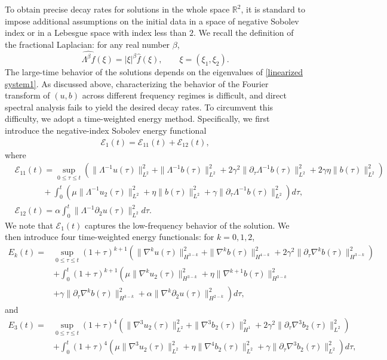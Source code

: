 \documentclass[reqno,11pt]{amsart}
\numberwithin{Thm}{section}
\begin{document}
To obtain precise decay rates for solutions in the whole space $\mathbb{R}^2$, it is
standard to impose additional assumptions on the initial data in a space of negative
Sobolev index or in a Lebesgue space with index less than $2$. We recall the definition
of the fractional Laplacian: for any real number $\beta$,
$$\widehat{\Lambda^{\beta}f}(\xi)=|\xi|^{\beta}\widehat{f}(\xi), \qquad \xi=(\xi_1,\xi_2).$$
The large-time behavior of the solutions depends on the eigenvalues of
\eqref{linearized system1}. As discussed above, characterizing the behavior of the
Fourier transform of $(u,b)$ across different frequency regimes is difficult, and direct
spectral analysis fails to yield the desired decay rates. To circumvent this difficulty,
we adopt a time-weighted energy method. Specifically, we first introduce the
negative-index Sobolev energy functional
\begin{align}\label{E-1}
	\mathcal{E}_1(t)=\mathcal{E}_{11}(t)+\mathcal{E}_{12}(t),
\end{align}
where
\begin{align*}
	&\mathcal{E}_{11}(t)=\sup_{0\leq\tau\leq t}\left(\|\Lambda^{-1} u(\tau)\|_{L^2}^2
	+\|\Lambda^{-1} b(\tau)\|_{L^2}^2+2\gamma^2\|\partial_\tau \Lambda^{-1} b(\tau)\|_{L^2}^2
+2\gamma\eta\|b(\tau)\|^2_{L^2}\right)\nonumber\\
	&\qquad \ \ \ \ \ \ +\int_{0}^t\left(\mu\|\Lambda^{-1} u_2(\tau)\|_{L^2}^2+\eta\| b(\tau)\|_{L^2}^2
	+\gamma\|\partial_\tau\Lambda^{-1} b(\tau)\|_{L^2}^2
	\right)d\tau,\\
    &\mathcal{E}_{12}(t)=\alpha\int_{0}^t
	\|\Lambda^{-1}\partial_2 u(\tau)\|_{L^2}^2d\tau.
\end{align*}
We note that $\mathcal{E}_1(t)$ captures the low-frequency behavior of the solution. We then introduce four
time-weighted energy functionals: for $k=0,1,2$,
\begin{align*}
	E_k(t)=&\sup_{0\leq\tau\leq t}(1+\tau)^{k+1}\left(\|\nabla^{k}u(\tau)\|_{H^{3-k}}^2
	+\|\nabla^{k}b(\tau)\|_{H^{4-k}}^2
	+2\gamma^2\|\partial_\tau\nabla^{k} b(\tau)\|_{H^{3-k}}^2\right)\\
	&+\int_{0}^t(1+\tau)^{k+1}\left(\mu\|\nabla^{k} u_2(\tau)\|_{H^{3-k}}^2
	+\eta\|\nabla^{k+1} b(\tau)\|_{H^{3-k}}^2\right.\\
	&+\left.\gamma\|\partial_\tau \nabla^{k}b(\tau)\|_{H^{3-k}}^2
	+\alpha\|\nabla^{k} \partial_2u(\tau)\|_{H^{2-k}}^2\right)d\tau,
\end{align*}
and
\begin{align*}
	E_3(t)=&\sup_{0\leq\tau\leq t}(1+\tau)^4\left(\|\nabla^3 u_2(\tau)\|_{L^2}^2
	+\|\nabla^3 b_2(\tau)\|_{H^1}^2
	+2\gamma^2\|\partial_\tau \nabla^3 b_2(\tau)\|_{L^2}^2\right)\\
	&+\int_{0}^t(1+\tau)^4\left(\mu\|\nabla^3 u_2(\tau)\|_{L^2}^2
	+\eta\|\nabla^4 b_2(\tau)\|_{L^2}^2
	+\gamma\|\partial_\tau\nabla^3 b_2(\tau)\|_{L^2}^2\right)d\tau,
\end{align*}
\end{document}
